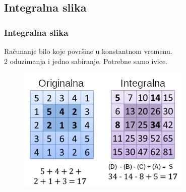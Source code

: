\documentclass{beamer}
\begin{document}
\subsection{Integralna slika}

\begin{frame}
  \frametitle{Integralna slika}
  Računanje bilo koje površine u konstantnom vremenu. \\
  2 oduzimanja i jedno sabiranje.
  Potrebne samo ivice.
  \begin{figure}[H]
    \centering
    \includegraphics[width=0.55\linewidth]{../images/integral_image2}
  \end{figure}
\end{frame}
\end{document}
